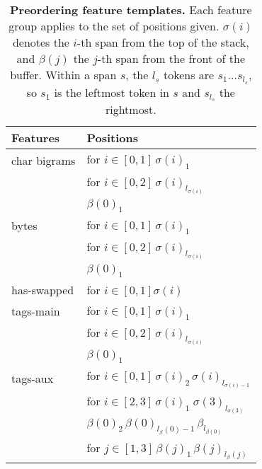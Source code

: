 \documentclass[11pt,letterpaper]{article}
\begin{document}
\begin{table}[htbp]
  \begin{tabular}{l|l}
  Features & Positions\\
  \hline
    char bigrams & for $i \in [0,1] \,\sigma(i)_1$  \\ 
                          & for $i \in [0,2] \,\sigma(i)_{l_{\sigma(i)}}$  \\ 
                          & $\beta(0)_1$  \\ 
     bytes & for $i \in [0,1] \,\sigma(i)_1$  \\ 
                          & for $i \in [0,2] \,\sigma(i)_{l_{\sigma(i)}}$  \\ 
                          & $\beta(0)_1$  \\ 
   has-swapped & for $i \in [0,1] \sigma(i)$ \\
    tags-main & for $i \in [0,1] \, \sigma(i)_1$ \\
                     & for $i \in [0,2] \, \sigma(i)_{l_{\sigma(i)}}$ \\
                     & $\beta(0)_1$ \\
   tags-aux & for $i \in [0,1] \, \sigma(i)_2 \, \sigma(i)_{l_{\sigma(i)-1}} $\\
                   & for $i \in [2,3] \, \sigma(i)_1 \; \sigma(3)_{l_{\sigma(3)}} $\\
                   & $\beta(0)_2 \, \beta(0)_{l_\beta(0)-1} \, \beta_{l_{\beta(0)}}$ \\
                   & for $j \in [1,3] \, \beta(j)_1 \, \beta(j)_{l_\beta(j)} $\\               
    
           \hline
  \end{tabular}
  \caption{{\bf Preordering feature templates.} Each feature group applies to the set of positions given. $\sigma(i)$ denotes the $i$-th span from the top of the stack, and $\beta(j)$ the $j$-th span from the front of the buffer.
  Within a span $s$, the $l_s$ tokens are $s_{1} ... s_{l_s}$, so $s_1$ is the leftmost token in $s$ and $s_{l_s}$ the rightmost.}
  \label{tab:preordering-features}
\end{table}
\end{document}
